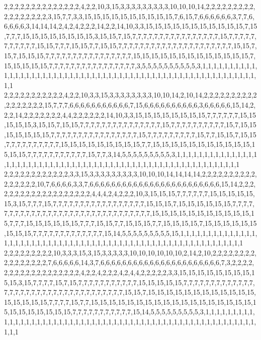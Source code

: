 2,2,2,2,2,2,2,2,2,2,2,2,2,2,4,2,2,10,3,15,3,3,3,3,3,3,3,3,3,10,10,10,14,2,2,2,2,2,2,2,2,2,2,2,2,2,2,2,2,2,3,15,7,7,3,3,15,15,15,15,15,15,15,15,15,15,7,6,15,7,6,6,6,6,6,6,3,7,7,6,6,6,6,6,3,14,14,14,2,4,2,4,2,2,2,14,2,2,14,10,3,3,15,15,15,15,15,15,15,15,15,15,15,7,15,7,7,7,15,15,15,15,15,15,15,15,3,15,15,7,15,7,7,7,7,7,7,7,7,7,7,7,7,7,7,7,7,15,7,7,7,7,7,7,7,7,7,7,7,15,15,7,7,7,15,15,7,7,15,15,7,7,7,7,7,7,7,7,7,7,7,7,7,7,7,7,7,7,7,7,7,15,15,7,15,7,15,15,15,7,7,7,7,7,7,7,7,7,7,7,7,7,7,7,7,15,15,15,15,15,15,15,15,15,15,15,15,15,7,15,15,15,15,15,7,7,7,7,7,7,7,7,7,7,7,7,7,7,7,7,3,5,5,5,5,5,5,5,5,5,5,3,1,1,1,1,1,1,1,1,1,1,1,1,1,1,1,1,1,1,1,1,1,1,1,1,1,1,1,1,1,1,1,1,1,1,1,1,1,1,1,1,1,1,1,1,1,1,1,1,1,1,1,1,1,1,1,1,1,1
2,2,2,2,2,2,2,2,2,2,2,4,2,2,10,3,3,15,3,3,3,3,3,3,3,3,10,10,14,2,10,14,2,2,2,2,2,2,2,2,2,2,2,2,2,2,2,2,2,15,7,7,7,6,6,6,6,6,6,6,6,6,6,6,7,15,6,6,6,6,6,6,6,6,6,6,3,6,6,6,6,6,15,14,2,2,2,14,2,2,2,2,2,2,2,4,4,2,2,2,2,2,2,14,10,3,3,15,15,15,15,15,15,15,15,7,7,7,7,7,7,15,15,15,15,15,3,15,15,7,15,15,7,7,7,7,7,7,7,7,7,7,7,7,7,7,7,15,7,7,7,7,7,7,7,7,7,7,15,7,15,15,15,15,15,15,15,7,7,7,7,7,7,7,7,7,7,7,7,7,7,7,7,15,7,7,7,7,7,7,7,7,7,15,7,7,15,15,7,15,15,7,7,7,7,7,7,7,7,7,7,15,15,15,15,15,15,15,15,15,7,7,15,15,15,15,15,15,15,15,15,15,15,15,15,15,7,7,7,7,7,7,7,7,7,7,7,15,7,7,3,14,5,5,5,5,5,5,5,5,5,3,1,1,1,1,1,1,1,1,1,1,1,1,1,1,1,1,1,1,1,1,1,1,1,1,1,1,1,1,1,1,1,1,1,1,1,1,1,1,1,1,1,1,1,1,1,1,1,1,1,1,1,1,1,1,1,1,1,1
2,2,2,2,2,2,2,2,2,2,2,2,3,3,15,3,3,3,3,3,3,3,3,3,10,10,10,14,14,14,14,2,2,2,2,2,2,2,2,2,2,2,2,2,2,2,2,10,7,6,6,6,6,3,3,7,6,6,6,6,6,6,6,6,6,6,6,6,6,6,6,6,6,6,6,6,6,6,6,6,15,14,2,2,2,2,2,2,2,2,2,2,2,2,2,2,2,2,2,2,2,4,4,4,2,4,2,2,2,10,3,15,15,15,7,7,7,7,7,7,15,15,15,15,15,15,3,15,7,7,7,15,7,7,7,7,7,7,7,7,7,7,7,7,7,7,7,7,7,15,15,15,7,15,15,15,15,15,15,7,7,7,7,7,7,7,7,7,7,7,7,7,7,7,7,7,7,7,7,7,7,7,7,7,7,7,7,7,7,7,15,15,15,15,15,15,15,15,15,15,15,15,7,7,7,15,15,15,15,15,15,7,7,7,15,15,7,7,15,15,15,7,7,15,15,15,15,7,15,15,15,15,15,15,15,15,15,7,7,7,7,7,7,7,7,7,7,7,7,7,15,14,5,5,5,5,5,5,5,5,5,15,1,1,1,1,1,1,1,1,1,1,1,1,1,1,1,1,1,1,1,1,1,1,1,1,1,1,1,1,1,1,1,1,1,1,1,1,1,1,1,1,1,1,1,1,1,1,1,1,1,1,1,1,1,1,1,1,1,1
2,2,2,2,2,2,2,2,2,10,3,3,3,15,3,15,3,3,3,3,3,10,10,10,10,10,10,2,14,2,10,2,2,2,2,2,2,2,2,2,2,2,2,2,2,2,2,7,6,6,6,6,6,14,3,7,6,6,6,6,6,6,6,6,6,6,6,6,6,6,6,6,6,6,6,6,6,6,7,3,2,2,2,2,2,2,2,2,2,2,2,2,2,2,2,2,2,2,4,2,2,4,2,2,2,4,2,4,4,2,2,2,2,2,3,3,15,15,15,15,15,15,15,15,15,15,3,15,7,7,7,7,15,7,15,7,7,7,7,7,7,7,7,7,7,7,15,15,15,15,15,7,7,7,7,7,7,7,7,7,7,7,7,7,7,7,7,7,7,7,7,7,7,7,7,7,7,7,7,7,7,7,7,7,7,7,15,15,7,15,15,15,15,15,15,15,15,15,15,15,15,15,15,15,15,15,7,7,7,7,15,7,7,15,15,15,15,15,15,15,15,15,15,15,15,15,15,15,15,15,15,15,15,15,15,15,15,15,15,7,7,7,7,7,7,7,7,7,7,7,15,14,5,5,5,5,5,5,5,5,5,3,1,1,1,1,1,1,1,1,1,1,1,1,1,1,1,1,1,1,1,1,1,1,1,1,1,1,1,1,1,1,1,1,1,1,1,1,1,1,1,1,1,1,1,1,1,1,1,1,1,1,1,1,1,1,1,1,1,1
